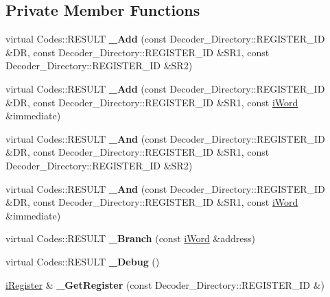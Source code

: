 \subsection*{Private Member Functions}
\begin{DoxyCompactItemize}
\item 
\hypertarget{classWi11_a90f2c17048a889b52b99ef2334f0ba55}{
virtual Codes::RESULT {\bfseries \_\-Add} (const Decoder\_\-Directory::REGISTER\_\-ID \&DR, const Decoder\_\-Directory::REGISTER\_\-ID \&SR1, const Decoder\_\-Directory::REGISTER\_\-ID \&SR2)}
\label{classWi11_a90f2c17048a889b52b99ef2334f0ba55}

\item 
\hypertarget{classWi11_a9b5e86294f943344021336108309bb52}{
virtual Codes::RESULT {\bfseries \_\-Add} (const Decoder\_\-Directory::REGISTER\_\-ID \&DR, const Decoder\_\-Directory::REGISTER\_\-ID \&SR1, const \hyperlink{classiWord}{iWord} \&immediate)}
\label{classWi11_a9b5e86294f943344021336108309bb52}

\item 
\hypertarget{classWi11_a9b6fb3285c524e01ae94f2204a4b50f1}{
virtual Codes::RESULT {\bfseries \_\-And} (const Decoder\_\-Directory::REGISTER\_\-ID \&DR, const Decoder\_\-Directory::REGISTER\_\-ID \&SR1, const Decoder\_\-Directory::REGISTER\_\-ID \&SR2)}
\label{classWi11_a9b6fb3285c524e01ae94f2204a4b50f1}

\item 
\hypertarget{classWi11_aa7a7fcfe6f5ebae0a2ab31be6029002e}{
virtual Codes::RESULT {\bfseries \_\-And} (const Decoder\_\-Directory::REGISTER\_\-ID \&DR, const Decoder\_\-Directory::REGISTER\_\-ID \&SR1, const \hyperlink{classiWord}{iWord} \&immediate)}
\label{classWi11_aa7a7fcfe6f5ebae0a2ab31be6029002e}

\item 
\hypertarget{classWi11_a01960bc45e7a70a276d91ff01cd637f9}{
virtual Codes::RESULT {\bfseries \_\-Branch} (const \hyperlink{classiWord}{iWord} \&address)}
\label{classWi11_a01960bc45e7a70a276d91ff01cd637f9}

\item 
\hypertarget{classWi11_a10d6c79140c97919e2778d1c4d6f8102}{
virtual Codes::RESULT {\bfseries \_\-Debug} ()}
\label{classWi11_a10d6c79140c97919e2778d1c4d6f8102}

\item 
\hypertarget{classWi11_a7b4a726a80ca57b9ce37d73d641b2072}{
\hyperlink{classiRegister}{iRegister} \& {\bfseries \_\-GetRegister} (const Decoder\_\-Directory::REGISTER\_\-ID \&)}
\label{classWi11_a7b4a726a80ca57b9ce37d73d641b2072}


\end{DoxyCompactItemize}
